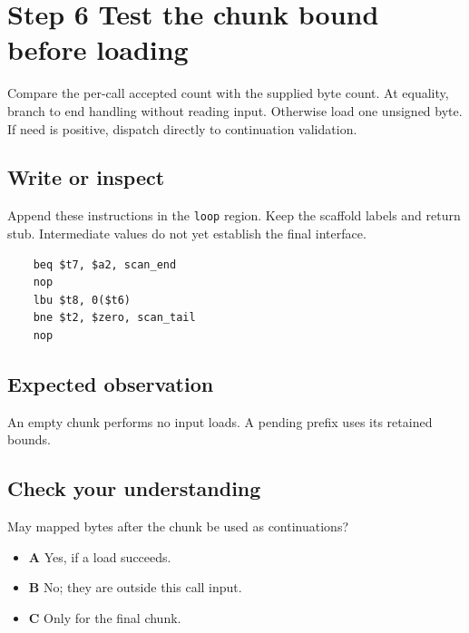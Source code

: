 \section{Step 6 Test the chunk bound before loading}\label{utf8-s06}

Compare the per-call accepted count with the supplied byte count. At equality, branch to end handling without reading input. Otherwise load one unsigned byte. If need is positive, dispatch directly to continuation validation.

\subsection{Write or inspect}
Append these instructions in the \texttt{loop} region. Keep the scaffold labels and return stub. Intermediate values do not yet establish the final interface.

\begin{verbatim}
    beq $t7, $a2, scan_end
    nop
    lbu $t8, 0($t6)
    bne $t2, $zero, scan_tail
    nop
\end{verbatim}

\subsection{Expected observation}
An empty chunk performs no input loads. A pending prefix uses its retained bounds.

\subsection{Check your understanding}
May mapped bytes after the chunk be used as continuations?

\begin{itemize}
  \item \textbf{A} Yes, if a load succeeds.
  \item \textbf{B} No; they are outside this call input.
  \item \textbf{C} Only for the final chunk.
\end{itemize}
